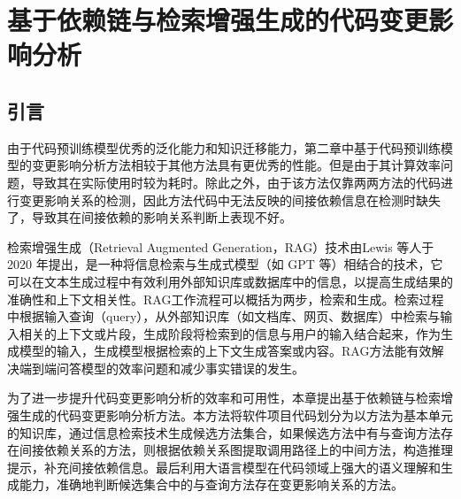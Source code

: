 \chapter{基于依赖链与检索增强生成的代码变更影响分析}

\section{引言}


由于代码预训练模型优秀的泛化能力和知识迁移能力，第二章中基于代码预训练模型的变更影响分析方法相较于其他方法具有更优秀的性能。但是由于其计算效率问题，导致其在实际使用时较为耗时。除此之外，由于该方法仅靠两两方法的代码进行变更影响关系的检测，因此方法代码中无法反映的间接依赖信息在检测时缺失了，导致其在间接依赖的影响关系判断上表现不好。

检索增强生成（Retrieval Augmented Generation，RAG）技术由Lewis 等人\cite{2020Retrieval}于 2020 年提出，是一种将信息检索与生成式模型（如 GPT 等）相结合的技术，它可以在文本生成过程中有效利用外部知识库或数据库中的信息，以提高生成结果的准确性和上下文相关性。RAG工作流程可以概括为两步，检索和生成。检索过程中根据输入查询（query），从外部知识库（如文档库、网页、数据库）中检索与输入相关的上下文或片段，生成阶段将检索到的信息与用户的输入结合起来，作为生成模型的输入，生成模型根据检索的上下文生成答案或内容。RAG方法能有效解决端到端问答模型的效率问题和减少事实错误的发生。

为了进一步提升代码变更影响分析的效率和可用性，本章提出基于依赖链与检索增强生成的代码变更影响分析方法。本方法将软件项目代码划分为以方法为基本单元的知识库，通过信息检索技术生成候选方法集合，如果候选方法中有与查询方法存在间接依赖关系的方法，则根据依赖关系图提取调用路径上的中间方法，构造推理提示，补充间接依赖信息。最后利用大语言模型在代码领域上强大的语义理解和生成能力，准确地判断候选集合中的与查询方法存在变更影响关系的方法。


